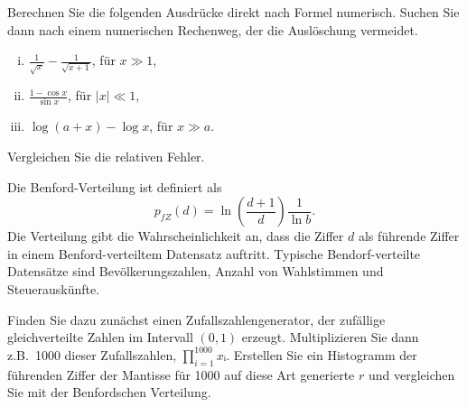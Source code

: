 
\NewDocumentCommand{}
\date{Ausgabe: Di, 2.4.2019, Besprechung: Fr, 5.4.2019}


\maketitle

\begin{question}[subtitle=Rundungsfehler]
  Berechnen Sie die folgenden Ausdrücke direkt nach Formel numerisch.
  Suchen Sie dann nach einem numerischen Rechenweg, der die Auslöschung
  vermeidet.
  \begin{enumerate}[(i)]
  \item $\frac{1}{\sqrt{x}} - \frac{1}{\sqrt{x + 1}}$, für $x ≫ 1$,
  \item $\frac{1 - \cos x}{\sin x}$, für $|x| ≪ 1 $,
  \item $\log (a + x) - \log x$, für $x ≫ a$.
  \end{enumerate}
  Vergleichen Sie die relativen Fehler.
\end{question}

\begin{question}[subtitle=Benfordsches Gesetz]
  Die Benford-Verteilung ist definiert als
  \begin{equation}
    \label{eq:benford}
    p_{fZ}(d) = \ln \left( \frac{d + 1}{d}\right) \frac{1}{\ln b}.
  \end{equation}
  Die Verteilung gibt die Wahrscheinlichkeit an, dass die Ziffer $d$ als führende Ziffer in einem Benford-verteiltem Datensatz auftritt.
  Typische Bendorf-verteilte Datensätze sind Bevölkerungszahlen, Anzahl von Wahlstimmen und Steuerauskünfte.

  Finden Sie dazu zunächst einen Zufallszahlengenerator, der zufällige gleichverteilte Zahlen im Intervall $(0, 1)$ erzeugt.
  Multiplizieren Sie dann z.B.\ \num{1000} dieser Zufallszahlen, $\prod_{i = 1}^{1000} xᵢ$.
  Erstellen Sie ein Histogramm der führenden Ziffer der Mantisse für 1000 auf diese Art generierte $r$ und
  vergleichen Sie mit der Benfordschen Verteilung.
\end{question}

